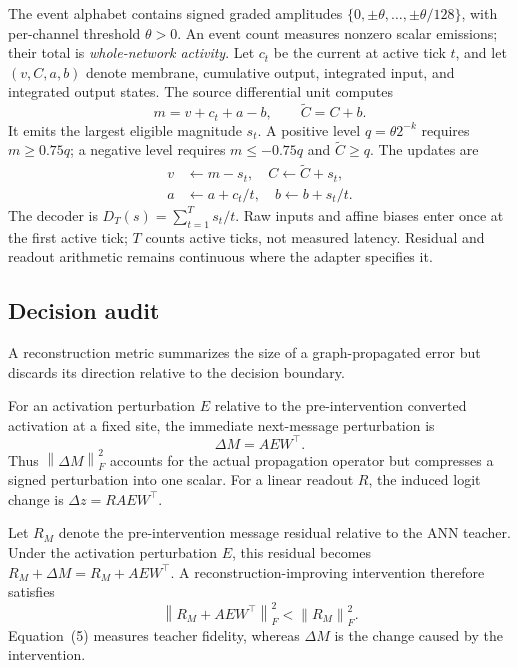 \documentclass[10pt,twocolumn,letterpaper]{article}
\newcommand{\norm}[1]{\left\lVert#1\right\rVert}
\begin{document}
The event alphabet contains signed graded amplitudes $\{0,\pm\theta,\ldots,\pm\theta/128\}$, with per-channel threshold $\theta>0$. An event count measures nonzero scalar emissions; their total is \emph{whole-network activity}. Let $c_t$ be the current at active tick $t$, and let $(v,C,a,b)$ denote membrane, cumulative output, integrated input, and integrated output states. The source differential unit computes
\begin{equation}
 m=v+c_t+a-b,\qquad \widetilde C=C+b.
\end{equation}
It emits the largest eligible magnitude $s_t$. A positive level $q=\theta 2^{-k}$ requires $m\geq 0.75q$; a negative level requires $m\leq -0.75q$ and $\widetilde C\geq q$. The updates are
\begin{equation}
\begin{split}
 v&\leftarrow m-s_t,\quad C\leftarrow\widetilde C+s_t,\\
 a&\leftarrow a+c_t/t,\quad b\leftarrow b+s_t/t.
\end{split}\label{eq:state}
\end{equation}
The decoder is $D_T(s)=\sum_{t=1}^T s_t/t$. Raw inputs and affine biases enter once at the first active tick; $T$ counts active ticks, not measured latency. Residual and readout arithmetic remains continuous where the adapter specifies it.
\subsection{Decision audit}
\label{sec:decision}
A reconstruction metric summarizes the size of a graph-propagated error but discards its direction relative to the decision boundary.

For an activation perturbation $E$ relative to the pre-intervention converted activation at a fixed site, the immediate next-message perturbation is
\begin{equation}
 \Delta M=AEW^\top.\label{eq:message}
\end{equation}
Thus $\norm{\Delta M}_F^2$ accounts for the actual propagation operator but compresses a signed perturbation into one scalar. For a linear readout $R$, the induced logit change is $\Delta z=RAEW^\top$.

Let $R_M$ denote the pre-intervention message residual relative to the ANN teacher. Under the activation perturbation $E$, this residual becomes $R_M+\Delta M=R_M+AEW^\top$. A reconstruction-improving intervention therefore satisfies
\begin{equation}
\norm{R_M+AEW^\top}_F^2<\norm{R_M}_F^2.
\label{eq:improvement}
\end{equation}
Equation~(5) measures teacher fidelity, whereas $\Delta M$ is the change caused by the intervention.
\end{document}
